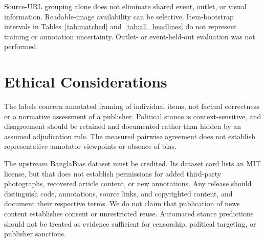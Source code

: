\documentclass[11pt]{article}
\begin{document}
Source-URL grouping alone does not eliminate shared event, outlet, or visual information. Readable-image availability can be selective. Item-bootstrap intervals in Tables~\ref{tab:matched} and~\ref{tab:all_headlines} do not represent training or annotation uncertainty. Outlet- or event-held-out evaluation was not performed.

\section*{Ethical Considerations}
The labels concern annotated framing of individual items, not factual correctness or a normative assessment of a publisher. Political stance is context-sensitive, and disagreement should be retained and documented rather than hidden by an assumed adjudication rule. The measured pairwise agreement does not establish representative annotator viewpoints or absence of bias.

The upstream BanglaBias dataset must be credited. Its dataset card lists an MIT license, but that does not establish permissions for added third-party photographs, recovered article content, or new annotations. Any release should distinguish code, annotations, source links, and copyrighted content, and document their respective terms. We do not claim that publication of news content establishes consent or unrestricted reuse. Automated stance predictions should not be treated as evidence sufficient for censorship, political targeting, or publisher sanctions.


\appendix
\end{document}
